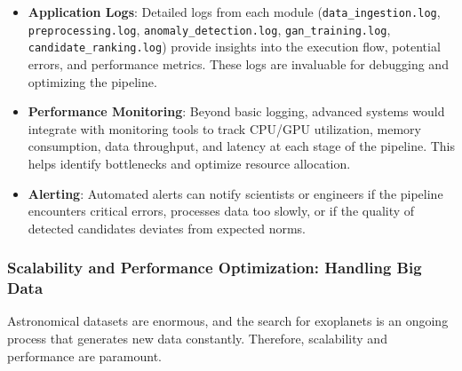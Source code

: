 \documentclass{article}
\begin{document}
\begin{itemize}
    \item \textbf{Application Logs}: Detailed logs from each module (\texttt{data\_ingestion.log}, \texttt{preprocessing.log}, \texttt{anomaly\_detection.log}, \texttt{gan\_training.log}, \texttt{candidate\_ranking.log}) provide insights into the execution flow, potential errors, and performance metrics. These logs are invaluable for debugging and optimizing the pipeline.
    \item \textbf{Performance Monitoring}: Beyond basic logging, advanced systems would integrate with monitoring tools to track CPU/GPU utilization, memory consumption, data throughput, and latency at each stage of the pipeline. This helps identify bottlenecks and optimize resource allocation.
    \item \textbf{Alerting}: Automated alerts can notify scientists or engineers if the pipeline encounters critical errors, processes data too slowly, or if the quality of detected candidates deviates from expected norms.
\end{itemize}

\subsubsection{Scalability and Performance Optimization: Handling Big Data}

Astronomical datasets are enormous, and the search for exoplanets is an ongoing process that generates new data constantly. Therefore, scalability and performance are paramount.
\end{document}
